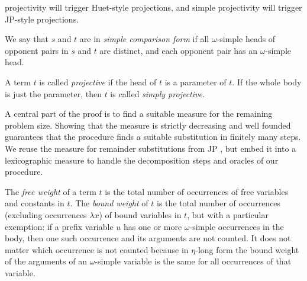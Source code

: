     projectivity will trigger Huet-style projections, and
    simple projectivity will trigger JP-style projections.
    \begin{defi}[$\jp D4$]
    \label{unif:def:simple-comparison-form}We say that $s$ and $t$ are in \emph{simple
    comparison form }if all $\omega$-simple heads of opponent pairs in $s$ and $t$ are distinct, and
    each opponent pair has an $\omega$-simple head.
    \end{defi}
    \begin{defi}[$\jp D5$]
    \label{unif:def:projective} A term $t$ is called \emph{projective }if the head
    of $t$ is a parameter of $t$. If the whole body is just
    the parameter, then $t$ is called \emph{simply projective.}
    \end{defi}
    A central part of the proof is to find a suitable measure for the
    remaining problem size. Showing that the measure is strictly decreasing
    and well founded guarantees that the procedure finds 
    a suitable substitution in finitely many steps. We reuse the measure for remainder substitutions
    from JP \cite{jp-76-unif}, but embed it into a lexicographic measure
    to handle the decomposition steps and oracles of our procedure.
    \begin{defi}[$\jp D7$] \label{unif:def:weights}
    The \emph{free weight} of a term $t$ is the total number of occurrences of
    free variables and constants in $t$.
    The \emph{bound weight} of $t$ is the total number of occurrences 
    (excluding occurrences $\lambda x$) of bound variables in $t$,
    but with a particular exemption: if a prefix variable $u$ 
    has one or more $\omega$-simple occurrences in the body,
    then one such occurrence and its arguments are not counted.
    It does not matter which occurrence is not counted because
    in $\eta$-long form the bound weight of the arguments of an 
    $\omega$-simple variable is the same for all occurrences
    of that variable.
    \end{defi}
